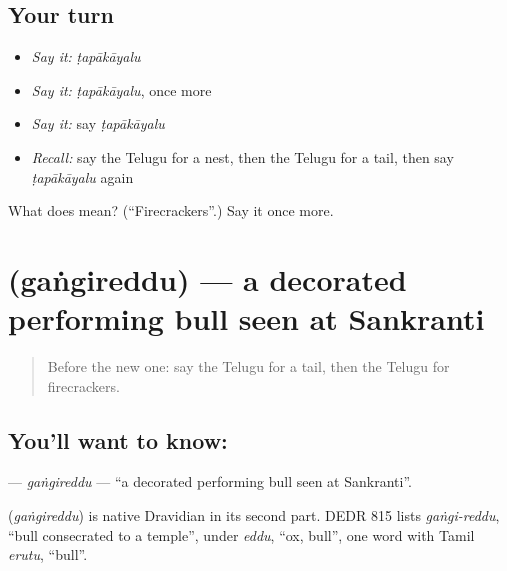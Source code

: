 \subsection*{Your turn}
\begin{itemize}
\raggedright
  \item \emph{Say it:} \emph{ṭapākāyalu}
  \item \emph{Say it:} \emph{ṭapākāyalu}, once more
  \item \emph{Say it:} say \emph{ṭapākāyalu}
  \item \emph{Recall:} say the Telugu for a nest, then the Telugu for a tail, then say \emph{ṭapākāyalu} again
\end{itemize}

\begin{tcolorbox}[breakable,colback=teal!4,colframe=teal!35!black,title={Before you move on}]
What does  mean? (\textquotedblleft{}Firecrackers\textquotedblright{}.) Say it once more.
\end{tcolorbox}
\section[\texorpdfstring{\te{గంగిరెద్దు} (gaṅgireddu)}{గంగిరెద్దు (gaṅgireddu)}]{ (gaṅgireddu) — a decorated performing bull seen at Sankranti}

\label{lesson:TE-C229-gangireddu}



\begin{quote}
Before the new one: say the Telugu for a tail, then the Telugu for firecrackers.
\end{quote}

\subsection*{You'll want to know: }
\textbf{} — \emph{gaṅgireddu} — \textquotedblleft{}a decorated performing bull seen at Sankranti\textquotedblright{}.

\begin{cousinweb}
\textbf{} (\emph{gaṅgireddu}) is native Dravidian in its second part. DEDR 815 lists \emph{gaṅgi-reddu}, \textquotedblleft{}bull consecrated to a temple\textquotedblright{}, under \emph{eddu}, \textquotedblleft{}ox, bull\textquotedblright{}, one word with Tamil \emph{erutu}, \textquotedblleft{}bull\textquotedblright{}.
\end{cousinweb}

